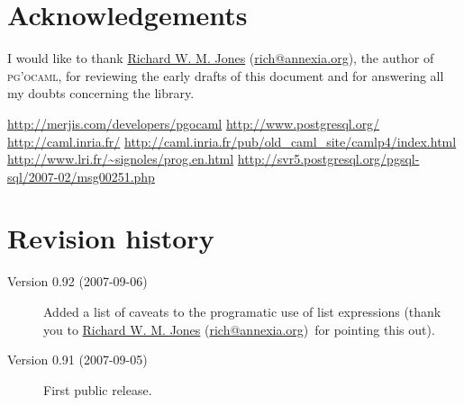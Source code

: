 \documentclass[11pt]{article}
\makeatletter
\newcommand{\pgocaml}{\textsc{pg'ocaml}\xspace}
\newcommand{\jonesemail}{rich@annexia.org}
\newcommand{\jones}{\href{mailto:\jonesemail}{Richard W. M. Jones} (\href{mailto:\jonesemail}{\jonesemail})}
\makeatother
\begin{document}

\section*{Acknowledgements}

I would like to thank \jones, the author of \pgocaml, for reviewing the early drafts
of this document and for answering all my doubts concerning the library.


\begin{thebibliography}{9}
	{\small\url{http://merjis.com/developers/pgocaml}}
	{\small\url{http://www.postgresql.org/}}
		{\small\url{http://caml.inria.fr/}}
		{\small\url{http://caml.inria.fr/pub/old\_caml\_site/camlp4/index.html}}
	{\small\url{http://www.lri.fr/~signoles/prog.en.html}}
	{\small\url{http://svr5.postgresql.org/pgsql-sql/2007-02/msg00251.php}}
\end{thebibliography}


\section*{Revision history}

\begin{description}

\item[Version 0.92 (2007-09-06)]

Added a list of caveats to the programatic use of list expressions
(thank you to \jones\ for pointing this out).

\item[Version 0.91 (2007-09-05)]

First public release.

\end{description}
\end{document}

